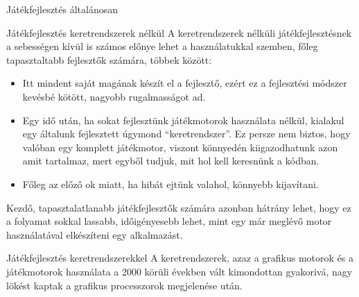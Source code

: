 \begin{MyChapter}{Játékfejlesztés általánosan}
\begin{MySection}{Játékfejlesztés keretrendszerek nélkül}
		A keretrendszerek nélküli játékfejlesztésnek a sebességen kívül is számos előnye lehet a használatukkal szemben, főleg tapasztaltabb fejlesztők számára, többek között:
		\begin{itemize}
			\item Itt mindent saját magának készít el a fejlesztő, ezért ez a fejlesztési módszer kevésbé kötött, nagyobb rugalmasságot ad.
			\item Egy idő után, ha sokat fejlesztünk játékmotorok használata nélkül, kialakul egy általunk fejlesztett úgymond ``keretrendszer''. Ez persze nem biztos, hogy valóban egy komplett játékmotor, viszont könnyedén kiigazodhatunk azon amit tartalmaz, mert egyből tudjuk, mit hol kell keresnünk a kódban.
			\item Főleg az előző ok miatt, ha hibát ejtünk valahol, könnyebb kijavítani.
		\end{itemize}
	
		Kezdő, tapasztalatlanabb játékfejlesztők számára azonban hátrány lehet, hogy ez a folyamat sokkal lassabb, időigényesebb lehet, mint egy már meglévő motor használatával elkészíteni egy alkalmazást.

	\end{MySection}

	\begin{MySection}{Játékfejlesztés keretrendszerekkel}
		A keretrendszerek, azaz a grafikus motorok és a játékmotorok használata a 2000 körüli években vált kimondottan gyakorivá, nagy lökést kaptak a grafikus processzorok megjelenése után.
		

\end{MySection}
\end{MyChapter}
